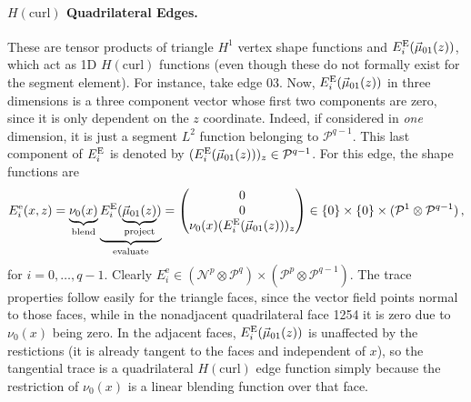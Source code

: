 
\paragraph{\texorpdfstring{$H(\mathrm{curl})$}{Hcurl} Quadrilateral Edges.} 
These are tensor products of triangle $H^1$ vertex shape functions and $E_i^{\mathrm{E}}(\vec{\mu}_{01}(z))$, which act as 1D $H(\mathrm{curl})$ functions (even though these do not formally exist for the segment element).
For instance, take edge 03. 
Now, $E_i^{\mathrm{E}}(\vec{\mu}_{01}(z))$ in three dimensions is a three component vector whose first two components are zero, since it is only dependent on the $z$ coordinate. 
Indeed, if considered in \textit{one} dimension, it is just a segment $L^2$ function belonging to $\mathcal{P}^{q-1}$. 
This last component of $E_i^{\mathrm{E}}$ is denoted by $(E_i^{\mathrm{E}}(\vec{\mu}_{01}(z)))_z\in\mathcal{P}^{q-1}$. 
For this edge, the shape functions are
\begin{equation*}
	E_i^\mathrm{e}(x,z)=\underbrace{\nu_0(x)}_{\text{blend}}
			\underbrace{E_i^{\mathrm{E}}(\underbrace{\vec{\mu}_{01}(z)}_{\text{project}})}_{\text{evaluate}}
		=\begin{pmatrix}0\\0\\\nu_0(x)(E_i^{\mathrm{E}}(\vec{\mu}_{01}(z)))_{z}\end{pmatrix}
			\in\{0\}\times\{0\}\times(\mathcal{P}^1\otimes\mathcal{P}^{q-1})\,,
\end{equation*}
for $i=0,\ldots,q-1$.
Clearly $E_i^\mathrm{e}\in(\mathcal{N}^p\otimes\mathcal{P}^q)\times(\mathcal{P}^p\otimes\mathcal{P}^{q-1})$.
The trace properties follow easily for the triangle faces, since the vector field points normal to those faces, while in the nonadjacent quadrilateral face 1254 it is zero due to $\nu_0(x)$ being zero.
In the adjacent faces, $E_i^{\mathrm{E}}(\vec{\mu}_{01}(z))$ is unaffected by the restictions (it is already tangent to the faces and independent of $x$), so the tangential trace is a quadrilateral $H(\text{curl})$ edge function simply because the restriction of $\nu_0(x)$ is a linear blending function over that face.

